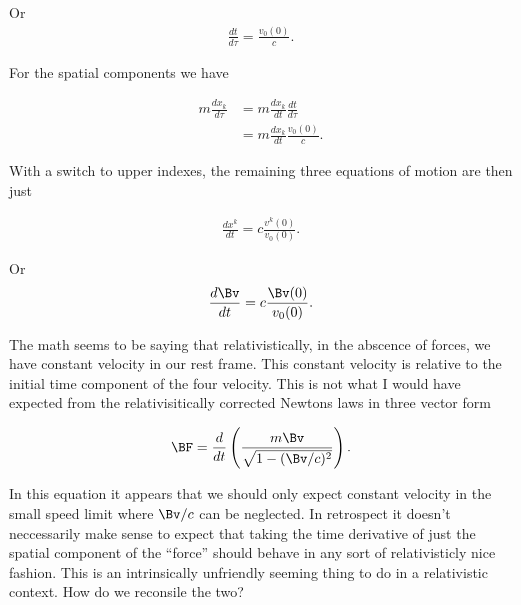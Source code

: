 Or 
\begin{align}\label{eqn:constFourMomentum:qqq8}
\frac{dt}{d\tau} = \frac{v_0(0)}{c}.
\end{align}

For the spatial components we have

\begin{align*}
m \frac{d x_k}{d\tau} 
&=
m \frac{d x_k}{dt}  \frac{dt}{d\tau} \\
&=
m \frac{d x_k}{dt}  \frac{v_0(0)}{c}.
\end{align*}

With a switch to upper indexes, the remaining three equations of motion are then just

\begin{align}\label{eqn:constFourMomentum:qqq10}
\frac{d x^k}{dt} = c \frac{ v^k(0) }{ v_0(0) }.
\end{align}

Or
\begin{align}\label{eqn:constFourMomentum:qqq10a}
\frac{d \Bv}{dt} = c \frac{ \Bv(0) }{ v_0(0) }.
\end{align}

The math seems to be saying that relativistically, in the abscence of forces, we have constant velocity in our rest frame.  This constant velocity is relative to the initial time component of the four velocity.  This is not what I would have expected from the relativisitically corrected Newtons laws in three vector form

\begin{align}\label{eqn:constFourMomentum:qqq11}
\BF = \frac{d}{dt}\left( \frac{m \Bv}{\sqrt{1 - (\Bv/c)^2}} \right).
\end{align}

In this equation it appears that we should only expect constant velocity in the small speed limit where $\Bv/c$ can be neglected.  In retrospect it doesn't neccessarily make sense to expect that taking the time derivative of just the spatial component of the ``force'' should behave in any sort of relativisticly nice fashion.  This is an intrinsically unfriendly seeming thing to do in a relativistic context.  How do we reconsile the two?

%
%

\EndNoBibArticle
